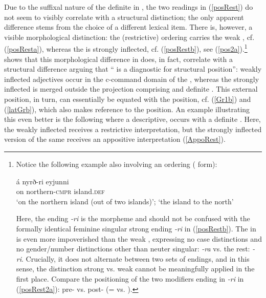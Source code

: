 \documentclass[output=paper,colorlinks,citecolor=brown]{langscibook}
\begin{document}
Due to the suffixal nature of the definite  in , the two readings in (\ref{posRest}) do not seem to visibly correlate with a  structural distinction; the only apparent difference stems from  the choice of a different lexical item.   
There is, however, a visible morphological distinction: the (restrictive) ordering  carries the weak , cf. (\ref{posResta}), whereas the  is strongly inflected, cf. (\ref{posRestb}), see (\ref{pos2a}).\footnote{Notice the following example also involving an ordering  ( form):  

\begin{exe}
    \ex   \gll á nyrð-ri eyjunni   \\ 
       on northern-\textsc{cmpr}  island.\textsc{def}   \\
       \glt `on the northern island (out of two islands)'; `the island to the north'  
\end{exe}

Here, the ending \textit{-ri} is the  morpheme and should not be confused with the formally identical feminine  singular strong ending  \textit{-ri} in (\ref{posRestb}).  
The   in  is even more impoverished than the weak , expressing no case distinctions and no gender/number distinctions other than neuter singular: \textit{-ra} vs. the rest: \textit{-ri}. Crucially, it does not alternate between two sets of endings, and in this sense, the distinction strong vs. weak cannot be meaningfully applied in the first place.  Compare the positioning of the two modifiers ending in \textit{-ri} in (\ref{posRest2a}): pre- vs. post- (=  vs. ).    }    \citet{Pfaff2015,Pfaff2017} shows that this morphological difference in  does, in fact, correlate with a structural difference arguing that `` is a diagnostic for structural position'': weakly inflected adjectives occur in the c-command domain of the , whereas the strongly inflected  is merged outside the projection comprising  and definite . This external position, in turn, can essentially be equated with the  position, cf. (\ref{Gr1b}) and (\ref{latGrb}), which also makes reference to the  position.  
An example illustrating this  even better is the following where a descriptive,   occurs with a definite . Here, the weakly inflected  receives a restrictive interpretation, but the strongly inflected version of the same  receives an appositive interpretation (\ref{AppoRest}).  
\end{document}
